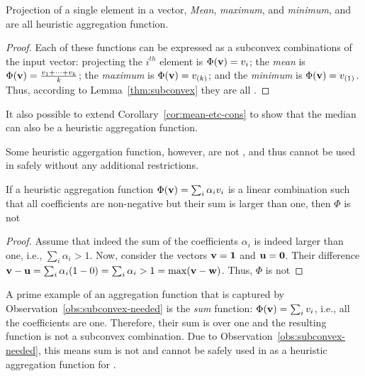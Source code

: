 
\begin{corollary}
Projection of a single element in a vector, 
\emph{Mean}, \emph{maximum}, and \emph{minimum}, and are all \axiomcons heuristic aggregation function.
\label{cor:mean-etc-cons}
\end{corollary}
\begin{proof}
	Each of these functions can be expressed as a subconvex combinations of the input vector: 
	projecting the $i^{th}$ element is $\Phi(\mathbf{v})=v_i$; the \emph{mean} is $\Phi(\mathbf{v}) = \frac{v_1 + \dots + v_k}{k}$; the \emph{maximum} is $\Phi(\mathbf{v})= v_{(k)}$; and the \emph{minimum} is $\Phi(\mathbf{v}) = v_{(1)}$. 
	Thus, according to Lemma~\ref{thm:subconvex} they are all \axiomcons. 
\end{proof}
It also possible to extend Corollary~\ref{cor:mean-etc-cons} to show that the median can also be a heuristic aggregation function. 

Some heuristic aggergation function, however, are not \axiomcons, and thus cannot be used in \kastar safely without any additional restrictions. 

\begin{observation}
	If a heuristic aggregation function $\Phi(\mathbf{v})=\sum_i \alpha_i v_i$ is a linear combination such that all coefficients are non-negative but their sum is larger than one, then $\Phi$ is not \axiomcons
	\label{obs:subconvex-needed}
\end{observation}
\begin{proof}
	Assume that indeed the sum of the coefficients $\alpha_i$ is indeed larger than one, i.e., $\sum_i \alpha_i > 1$.
	Now, consider the vectors $\mathbf{v} = \mathbf{1}$ and $\mathbf{u} = \mathbf{0}$. Their difference  	
	$\mathbf{v} - \mathbf{u} = \sum_i \alpha_i (1 - 0) = \sum_i \alpha_i > 1 = \max (\mathbf{v} - \mathbf{w})$. Thus, $\Phi$ is not \axiomcons
\end{proof}
A prime example of an aggregation function that is captured by Observation~\ref{obs:subconvex-needed} is the \emph{sum} function: $\Phi(\mathbf{v})=\sum_i v_i$, i.e., all the coefficients are one. Therefore, their sum is over one and the resulting function is not a subconvex combination. Due to Observation~\ref{obs:subconvex-needed}, this means sum is not \axiomcons and cannot be safely used in as a heuristic aggregation function for \kastar. 





